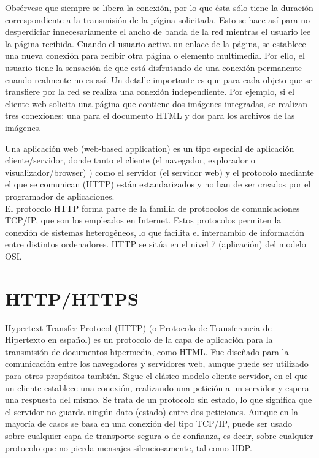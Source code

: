 Obsérvese que siempre se libera la conexión, por lo que ésta sólo tiene la duración
correspondiente a la transmisión de la página solicitada. Esto se hace así para no
desperdiciar innecesariamente el ancho de banda de la red mientras el usuario lee la
página recibida.
Cuando el usuario activa un enlace de la página, se establece una nueva conexión
para recibir otra página o elemento multimedia. Por ello, el usuario tiene la sensación
de que está disfrutando de una conexión permanente cuando realmente no es así.
Un detalle importante es que para cada objeto que se transfiere por la red se realiza
una conexión independiente. Por ejemplo, si el cliente web solicita una página que
contiene dos imágenes integradas, se realizan tres conexiones: una para el documento
HTML y dos para los archivos de las imágenes.

Una aplicación web (web-based application) es un tipo especial de aplicación cliente/servidor, donde tanto el cliente (el navegador, explorador o visualizador/browser)
) como
el servidor (el servidor web) y el protocolo mediante el que se comunican (HTTP)
están estandarizados y no han de ser creados por el programador de aplicaciones.
\\
El protocolo HTTP forma parte de la familia de protocolos de comunicaciones
TCP/IP, que son los empleados en Internet. Estos protocolos permiten la conexión
de sistemas heterogéneos, lo que facilita el intercambio de información entre distintos
ordenadores. HTTP se sitúa en el nivel 7 (aplicación) del modelo OSI.

\section{HTTP/HTTPS}

\cite{mdn}Hypertext Transfer Protocol (HTTP) (o Protocolo de Transferencia de Hipertexto en español) es un protocolo de la capa de aplicación para la transmisión de documentos hipermedia, como HTML. Fue diseñado para la comunicación entre los navegadores y servidores web, aunque puede ser utilizado para otros propósitos también. Sigue el clásico modelo cliente-servidor, en el que un cliente establece una conexión, realizando una petición a un servidor y espera una respuesta del mismo. Se trata de un protocolo sin estado, lo que significa que el servidor no guarda ningún dato (estado) entre dos peticiones. Aunque en la mayoría de casos se basa en una conexión del tipo TCP/IP, puede ser usado sobre cualquier capa de transporte segura o de confianza, es decir, sobre cualquier protocolo que no pierda mensajes silenciosamente, tal como UDP.

